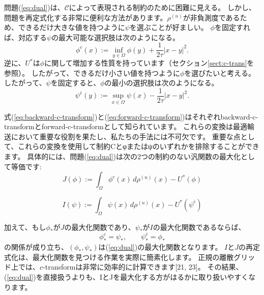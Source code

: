 \documentclass{jsarticle}
\theoremstyle{definition}
\begin{document}
問題(\ref{eq:dual})は、$\mathcal{C}$によって表現される制約のために困難に見える。
しかし、問題を再定式化する非常に便利な方法があります。$\rho^{(n)}$が非負測度であるため、できるだけ大きな値を持つように$\psi$を選ぶことが好ましい。
$\phi$を固定すれば、対応する$\psi$の最大可能な選択肢は次のようになる。
\begin{equation}
    \label{eq:backward-c-transform}
    \phi^c(x) := \inf_{y\in\Omega} \phi(y) + \frac{1}{2 \tau}|x - y|^2.
\end{equation}
逆に、$U^*$は$\phi$に関して増加する性質を持っています（セクション\ref{sect:c-trans}を参照）。
したがって、できるだけ小さい値を持つように$\phi$を選びたいと考える。
したがって、$\psi$を固定すると、$\phi$の最小の選択肢は次のようになる。
\begin{equation}
    \label{eq:forward-c-transform}
    \psi^{\bar{c}}(y):= \sup_{x\in\Omega} \psi(x) - \frac{1}{2 \tau}|x-y|^2.
\end{equation}

\vspace\baselineskip 

式(\ref{eq:backward-c-transform})と(\ref{eq:forward-c-transform})はそれぞれbackward-c-transformとforward-c-transformとして知られています。
これらの変換は最適輸送において重要な役割を果たし、私たちの手法には不可欠です。
重要な点として、これらの変換を使用して制約Cとφまたはψのいずれかを排除することができます。
具体的には、問題(\ref{eq:dual})は次の2つの制約のない汎関数の最大化として等価です:
\begin{equation}
    \label{eq:J}
    J(\phi):= \int_{\Omega} \phi^c(x) \,d\rho^{(n)}(x) - U^*(\phi)
\end{equation}

\begin{equation}
    \label{eq:I}
    I(\psi):= \int_{\Omega} \psi(x) \, d\rho^{(n)}(x) - U^*(\psi^{\bar{c}})
\end{equation}

加えて、もし$\phi_*$が$J$の最大化関数であり、$\psi_*$が$I$の最大化関数であるならば、
$$
    \phi_*^c = \psi_*, \qquad \psi_*^{\bar{c}} = \phi_*
$$
の関係が成り立ち、$(\phi_*, \psi_*)$は(\ref{eq:dual})の最大化関数となります。
$I$と$J$の再定式化は、最大化関数を見つける作業を実際に簡素化します。
正規の離散グリッド上では、$c$-transformは非常に効率的に計算できます[21, 23]。
その結果、(\ref{eq:dual})を直接扱うよりも、IとJを最大化する方がはるかに取り扱いやすくなります。\\
\end{document}
